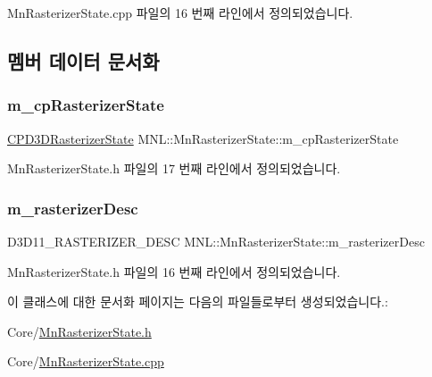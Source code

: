 Mn\+Rasterizer\+State.\+cpp 파일의 16 번째 라인에서 정의되었습니다.



\subsection{멤버 데이터 문서화}
\mbox{\label{class_m_n_l_1_1_mn_rasterizer_state_a185dd087f95f0e05f6c0cc03cf79b791}} 
\subsubsection{\texorpdfstring{m\+\_\+cp\+Rasterizer\+State}{m\_cpRasterizerState}}
{\footnotesize\ttfamily \hyperlink{namespace_m_n_l_aa6c2682c64c5b58c458c36bb424f1e56}{C\+P\+D3\+D\+Rasterizer\+State} M\+N\+L\+::\+Mn\+Rasterizer\+State\+::m\+\_\+cp\+Rasterizer\+State\hspace{0.3cm}{\ttfamily [private]}}



Mn\+Rasterizer\+State.\+h 파일의 17 번째 라인에서 정의되었습니다.

\mbox{\label{class_m_n_l_1_1_mn_rasterizer_state_a2eeef6c6d928646b13b441999a874ef5}} 
\subsubsection{\texorpdfstring{m\+\_\+rasterizer\+Desc}{m\_rasterizerDesc}}
{\footnotesize\ttfamily D3\+D11\+\_\+\+R\+A\+S\+T\+E\+R\+I\+Z\+E\+R\+\_\+\+D\+E\+SC M\+N\+L\+::\+Mn\+Rasterizer\+State\+::m\+\_\+rasterizer\+Desc\hspace{0.3cm}{\ttfamily [private]}}



Mn\+Rasterizer\+State.\+h 파일의 16 번째 라인에서 정의되었습니다.



이 클래스에 대한 문서화 페이지는 다음의 파일들로부터 생성되었습니다.\+:\begin{DoxyCompactItemize}
\item 
Core/\hyperlink{_mn_rasterizer_state_8h}{Mn\+Rasterizer\+State.\+h}\item 
Core/\hyperlink{_mn_rasterizer_state_8cpp}{Mn\+Rasterizer\+State.\+cpp}\end{DoxyCompactItemize}
